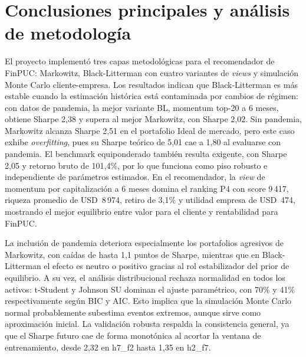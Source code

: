 \section{Conclusiones principales y análisis de metodología}

El proyecto implement\'o tres capas metodol\'ogicas para el recomendador de FinPUC: Markowitz, Black-Litterman con cuatro variantes de \textit{views} y simulaci\'on Monte Carlo cliente-empresa. Los resultados indican que Black-Litterman es m\'as estable cuando la estimaci\'on hist\'orica est\'a contaminada por cambios de r\'egimen: con datos de pandemia, la mejor variante BL, momentum top-20 a 6 meses, obtiene Sharpe 2,38 y supera al mejor Markowitz, con Sharpe 2,02. Sin pandemia, Markowitz alcanza Sharpe 2,51 en el portafolio Ideal de mercado, pero este caso exhibe \textit{overfitting}, pues su Sharpe te\'orico de 5,01 cae a 1,80 al evaluarse con pandemia. El benchmark equiponderado tambi\'en resulta exigente, con Sharpe 2,05 y retorno bruto de 101,4\%, por lo que funciona como piso robusto e independiente de par\'ametros estimados. En el recomendador, la \textit{view} de momentum por capitalizaci\'on a 6 meses domina el ranking P4 con score 9\,417, riqueza promedio de USD~8\,974, retiro de 3,1\% y utilidad empresa de USD~474, mostrando el mejor equilibrio entre valor para el cliente y rentabilidad para FinPUC.

La inclusi\'on de pandemia deteriora especialmente los portafolios agresivos de Markowitz, con ca\'idas de hasta 1,1 puntos de Sharpe, mientras que en Black-Litterman el efecto es neutro o positivo gracias al rol estabilizador del prior de equilibrio. A su vez, el an\'alisis distribucional rechaza normalidad en todos los activos: t-Student y Johnson SU dominan el ajuste param\'etrico, con 70\% y 41\% respectivamente seg\'un BIC y AIC. Esto implica que la simulaci\'on Monte Carlo normal probablemente subestima eventos extremos, aunque sirve como aproximaci\'on inicial. La validaci\'on robusta respalda la consistencia general, ya que el Sharpe futuro cae de forma monot\'onica al acortar la ventana de entrenamiento, desde 2,32 en h7\_f2 hasta 1,35 en h2\_f7.

